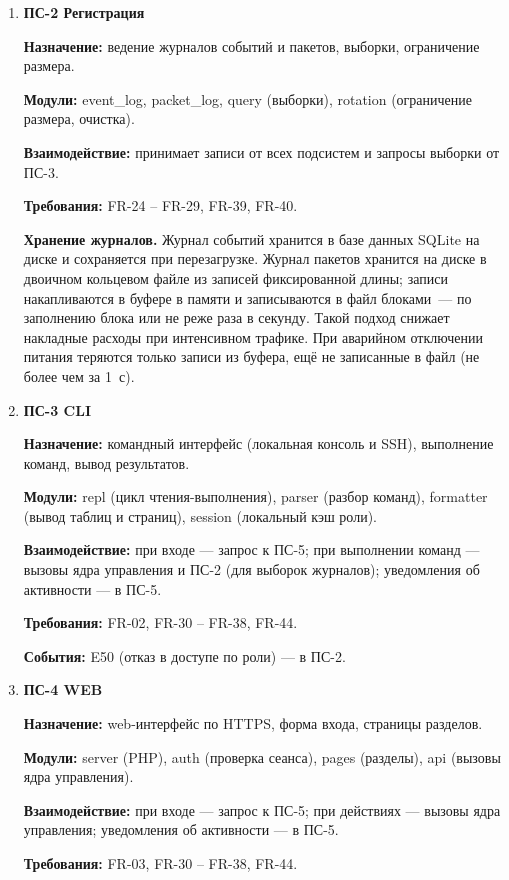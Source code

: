 \documentclass[13pt,a4paper,final]{article}
\begin{document}
\begin{enumerate}
		\item \textbf{ПС-2 Регистрация}
		
		\textbf{Назначение:} ведение журналов событий и пакетов, выборки, ограничение размера.
		
		\textbf{Модули:} event\_log, packet\_log, query (выборки), rotation (ограничение размера, очистка).
		
		\textbf{Взаимодействие:} принимает записи от всех подсистем и запросы выборки от ПС-3.
		
		\textbf{Требования:} FR-24 – FR-29, FR-39, FR-40.
		
		\textbf{Хранение журналов.} Журнал событий хранится в базе данных SQLite на диске и сохраняется при перезагрузке. \textcolor{edit}{Журнал пакетов хранится на диске в двоичном кольцевом файле из записей фиксированной длины; записи накапливаются в буфере в памяти и записываются в файл блоками~--- по заполнению блока или не реже раза в секунду. Такой подход снижает накладные расходы при интенсивном трафике. При аварийном отключении питания теряются только записи из буфера, ещё не записанные в файл (не более чем за 1~с).}
		
		\item 	\textbf{ПС-3 CLI}
		
		\textbf{Назначение:} командный интерфейс (локальная консоль и SSH), выполнение команд, вывод результатов.
		
		\textbf{Модули:} repl (цикл чтения-выполнения), parser (разбор команд), formatter (вывод таблиц и страниц), session (локальный кэш роли).
		
		\textbf{Взаимодействие:} при входе — запрос к ПС-5; при выполнении команд — вызовы ядра управления и ПС-2 (для выборок журналов); уведомления об активности — в ПС-5.
		
		\textbf{Требования:} FR-02, FR-30 – FR-38, FR-44.
		
		\textbf{События:} E50 (отказ в доступе по роли) — в ПС-2.
		
		\item	\textbf{ПС-4 WEB}
		
		\textbf{Назначение:} web-интерфейс по HTTPS, форма входа, страницы разделов.
		
		\textbf{Модули:} server (PHP), auth (проверка сеанса), pages (разделы), api (вызовы ядра управления).
		
		\textbf{Взаимодействие:} при входе — запрос к ПС-5; при действиях — вызовы ядра управления; уведомления об активности — в ПС-5.
		
		\textbf{Требования:} FR-03, FR-30 – FR-38, FR-44.
		

\end{enumerate}
\end{document}
